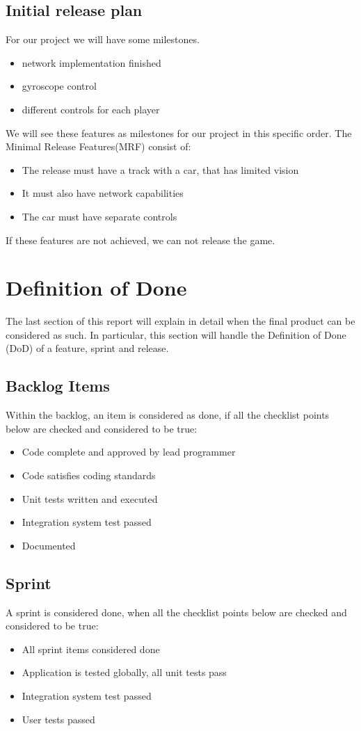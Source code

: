 \documentclass[11pt,twoside,a4paper]{article}
\begin{document}
\subsection{Initial release plan}
For our project we will have some milestones.
\begin{itemize}
\item network implementation finished
\item gyroscope control
\item different controls for each player
\end{itemize}
We will see these features as milestones for our project in this specific order. The Minimal Release Features(MRF) consist of:
\begin{itemize}
\item The release must have a track with a car, that has limited vision
\item It must also have network capabilities
\item The car must have separate controls
\end{itemize}
If these features are not achieved, we can not release the game.


\newpage

\section{Definition of Done}
The last section of this report will explain in detail when the final product can be considered as such. In particular, this section will  handle the Definition of Done (DoD) of a feature, sprint and release.
\subsection{Backlog Items}
Within the backlog, an item is considered as done, if all the checklist points below are checked and considered to be true:
\begin{itemize}
	\item Code complete and approved by lead programmer
	\item Code satisfies coding standards
	\item Unit tests written and executed
	\item Integration system test passed
	\item Documented
\end{itemize}
\subsection{Sprint}
A sprint is considered done, when all the checklist points below are checked and considered to be true:
\begin{itemize}
	\item All sprint items considered done
	\item Application is tested globally, all unit tests pass
	\item Integration system test passed
	\item User tests passed
\end{itemize}
\end{document}
